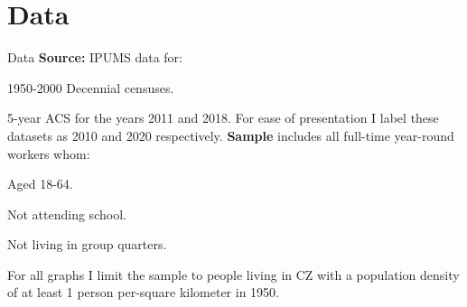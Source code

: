 \section{Data}
\begin{frame}{Data}
	\textbf{\alert{Source:}} IPUMS data for:
		\bitem 
		\item 1950-2000 Decennial censuses.
		\item 5-year ACS for the years 2011 and 2018. For ease of presentation I label these datasets as 2010 and 2020 respectively.
	\eitem
	\textbf{\alert{Sample}} includes all full-time year-round workers whom:
	\bitem
		\item Aged 18-64.
		\item Not attending school.
		\item Not living in group quarters.
		\item For all graphs I limit the sample to people living in CZ with a population density of at least 1 person per-square kilometer in 1950.
	\eitem
\end{frame}